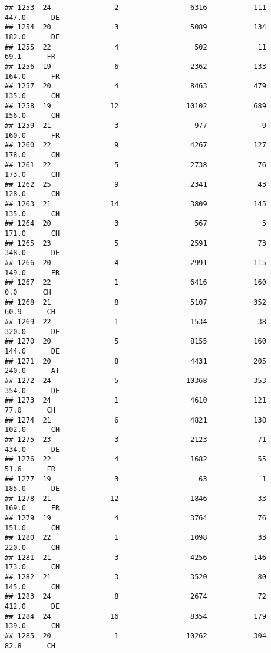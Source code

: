 \documentclass[
]{article}
\begin{document}
\begin{verbatim}
## 1253  24               2                 6316           111    447.0      DE
## 1254  20               3                 5089           134    182.0      DE
## 1255  22               4                  502            11     69.1      FR
## 1256  19               6                 2362           133    164.0      FR
## 1257  20               4                 8463           479    135.0      CH
## 1258  19              12                10102           689    156.0      CH
## 1259  21               3                  977             9    160.0      FR
## 1260  22               9                 4267           127    178.0      CH
## 1261  22               5                 2738            76    173.0      CH
## 1262  25               9                 2341            43    128.0      CH
## 1263  21              14                 3809           145    135.0      CH
## 1264  20               3                  567             5    171.0      CH
## 1265  23               5                 2591            73    348.0      DE
## 1266  20               4                 2991           115    149.0      FR
## 1267  22               1                 6416           160      0.0      CH
## 1268  21               8                 5107           352     60.9      CH
## 1269  22               1                 1534            38    320.0      DE
## 1270  20               5                 8155           160    144.0      DE
## 1271  20               8                 4431           205    240.0      AT
## 1272  24               5                10368           353    354.0      DE
## 1273  24               1                 4610           121     77.0      CH
## 1274  21               6                 4821           138    102.0      CH
## 1275  23               3                 2123            71    434.0      DE
## 1276  22               4                 1682            55     51.6      FR
## 1277  19               3                   63             1    185.0      DE
## 1278  21              12                 1846            33    169.0      FR
## 1279  19               4                 3764            76    151.0      CH
## 1280  22               1                 1098            33    220.0      CH
## 1281  21               3                 4256           146    173.0      CH
## 1282  21               3                 3520            80    145.0      CH
## 1283  24               8                 2674            72    412.0      DE
## 1284  24              16                 8354           179    139.0      CH
## 1285  20               1                10262           304     82.8      CH

\end{verbatim}
\end{document}
